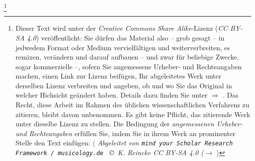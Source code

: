 %
%
%

\footnote{Dieser Text wird unter der \emph{Creative Commons Share Alike}-Lizenz
(\emph{CC BY-SA 4.0}) veröffentlicht: Sie dürfen das Material also -- grob
gesagt -- in jedwedem Format oder Medium vervielfältigen und weiterverbreiten,
es remixen, verändern und darauf aufbauen -- und zwar für beliebige Zwecke,
sogar kommerzielle --, sofern Sie angemessene Urheber- und Rechteangaben machen,
einen Link zur Lizenz beifügen, Ihr abgeleitetes Werk unter derselben Lizenz
verbreiten und angeben, ob und wo Sie das Original in welcher Hichsicht geändert
haben. Details dazu finden Sie unter $\Rightarrow$
.
Das Recht, diese Arbeit im Rahmen des üblichen wissenschaftlichen Verfahrens zu
zitieren, bleibt davon unbenommen. Es gibt keine Pflicht, das zitierende Werk
unter dieselbe Lizenz zu stellen. Die Bedingung der \emph{an\-ge\-mes\-se\-nen
Urheber- und Rechteangaben} erfüllen Sie, indem Sie in ihrem Werk an prominenter
Stelle den Text einfügen: $\langle$ {\itshape Abgeleitet von \texttt{mind your
Scholar Research Framework / musicology.de } \copyright\ K. Reincke CC BY-SA 4.0
($\rightarrow$
 }
$\rangle$ }

